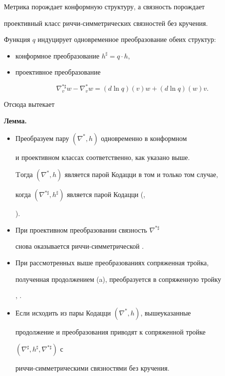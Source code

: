 Метрика порождает конформную структуру, а связность порождает

проективный класс риччи-симметрических связностей без кручения.

Функция $q$ индуцирует одновременное преобразование обеих структур:

\begin{itemize}

\item[(i)] конформное преобразование $h^\sharp = q \cdot h$,

\item[(ii)] проективное преобразование

$$

\nabla ^{*\sharp}_v w - \nabla ^*_v w = (d \ln q)(v)w + (d \ln q)(w)v.

$$

\end{itemize}



Отсюда вытекает



{\bf Лемма.}

\begin{itemize}

\item[(a)] Преобразуем пару $(\nabla ^*, h)$ одновременно в конформном

и проективном классах соответственно, как указано выше.

Tогда $(\nabla ^*, h)$ является парой Кодацци в том и только том случае,

когда $(\nabla ^{*\sharp}, h^\sharp)$ является парой Кодацци (\cite{SIM-3},

\cite{SIM-S-V}).

\item[(b)] При проективном преобразовании связность $\nabla ^{*\sharp}$

снова оказывается риччи-симметрической \cite{SIM-3}.

\item[(c)] При рассмотренных выше преобразованиях сопряженная тройка,

полученная продолжением (a), преобразуется в сопряженную тройку

\cite{BOK-G-S-2}, \cite{SIM-4}.

\item[(d)] Если исходить из пары Кодацци $(\nabla ^*, h)$, вышеуказанные

продолжение и преобразования приводят к сопряженной тройке

$(\nabla^\sharp, h^\sharp,\nabla ^{*\sharp} )$ с

риччи-симметрическими связностями без кручения.

\end{itemize}



